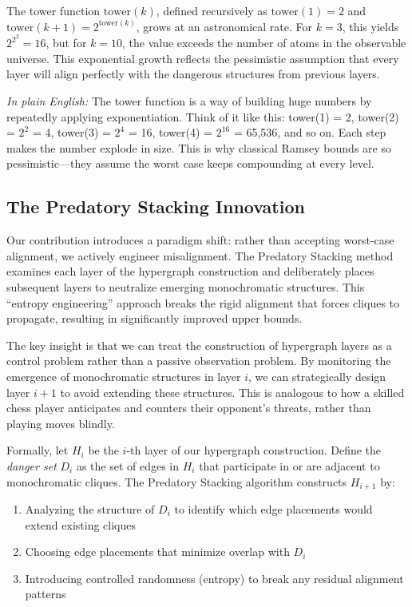 \documentclass[12pt]{article}
\begin{document}
The tower function $\text{tower}(k)$, defined recursively as $\text{tower}(1) = 2$ and $\text{tower}(k+1) = 2^{\text{tower}(k)}$, grows at an astronomical rate. For $k=3$, this yields $2^{2^{2}} = 16$, but for $k=10$, the value exceeds the number of atoms in the observable universe. This exponential growth reflects the pessimistic assumption that every layer will align perfectly with the dangerous structures from previous layers.

\textit{In plain English:} The tower function is a way of building huge numbers by repeatedly applying exponentiation. Think of it like this: tower(1) = 2, tower(2) = $2^2$ = 4, tower(3) = $2^4$ = 16, tower(4) = $2^{16}$ = 65,536, and so on. Each step makes the number explode in size. This is why classical Ramsey bounds are so pessimistic—they assume the worst case keeps compounding at every level.

\subsection{The Predatory Stacking Innovation}
Our contribution introduces a paradigm shift: rather than accepting worst-case alignment, we actively engineer misalignment. The Predatory Stacking method examines each layer of the hypergraph construction and deliberately places subsequent layers to neutralize emerging monochromatic structures. This ``entropy engineering'' approach breaks the rigid alignment that forces cliques to propagate, resulting in significantly improved upper bounds.

The key insight is that we can treat the construction of hypergraph layers as a control problem rather than a passive observation problem. By monitoring the emergence of monochromatic structures in layer $i$, we can strategically design layer $i+1$ to avoid extending these structures. This is analogous to how a skilled chess player anticipates and counters their opponent's threats, rather than playing moves blindly.

Formally, let $H_i$ be the $i$-th layer of our hypergraph construction. Define the \textit{danger set} $D_i$ as the set of edges in $H_i$ that participate in or are adjacent to monochromatic cliques. The Predatory Stacking algorithm constructs $H_{i+1}$ by:
\begin{enumerate}
    \item Analyzing the structure of $D_i$ to identify which edge placements would extend existing cliques
    \item Choosing edge placements that minimize overlap with $D_i$
    \item Introducing controlled randomness (entropy) to break any residual alignment patterns
\end{enumerate}
\end{document}

